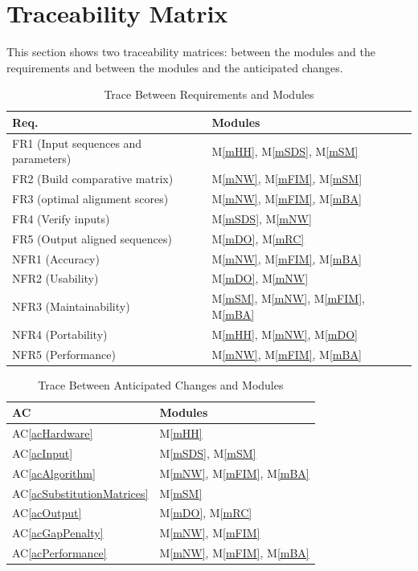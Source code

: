 \documentclass[12pt, titlepage]{article}
\newcommand{\acref}[1]{AC\ref{#1}}
\newcommand{\mref}[1]{M\ref{#1}}
\begin{document}
\section{Traceability Matrix} \label{SecTM}

This section shows two traceability matrices: between the modules and the
requirements and between the modules and the anticipated changes.

\begin{table}[H]
\centering
\begin{tabular}{p{} p{}}
\toprule
\textbf{Req.} & \textbf{Modules}\\
\midrule
FR1 (Input sequences and parameters) & \mref{mHH}, \mref{mSDS}, \mref{mSM} \\
FR2 (Build comparative matrix) & \mref{mNW}, \mref{mFIM}, \mref{mSM} \\
FR3 (optimal alignment scores) & \mref{mNW}, \mref{mFIM}, \mref{mBA} \\
FR4 (Verify inputs) & \mref{mSDS}, \mref{mNW} \\
FR5 (Output aligned sequences) & \mref{mDO}, \mref{mRC} \\
NFR1 (Accuracy) & \mref{mNW}, \mref{mFIM}, \mref{mBA} \\
NFR2 (Usability) & \mref{mDO}, \mref{mNW} \\
NFR3 (Maintainability) & \mref{mSM}, \mref{mNW}, \mref{mFIM}, \mref{mBA} \\
NFR4 (Portability) & \mref{mHH}, \mref{mNW}, \mref{mDO} \\
NFR5 (Performance) & \mref{mNW}, \mref{mFIM}, \mref{mBA} \\
\bottomrule
\end{tabular}
\caption{Trace Between Requirements and Modules}
\label{TblRT}
\end{table}

\begin{table}[H]
\centering
\begin{tabular}{p{} p{}}
\toprule
\textbf{AC} & \textbf{Modules}\\
\midrule
\acref{acHardware} & \mref{mHH} \\
\acref{acInput} & \mref{mSDS}, \mref{mSM} \\
\acref{acAlgorithm} & \mref{mNW}, \mref{mFIM}, \mref{mBA} \\
\acref{acSubstitutionMatrices} & \mref{mSM} \\
\acref{acOutput} & \mref{mDO}, \mref{mRC} \\
\acref{acGapPenalty} & \mref{mNW}, \mref{mFIM} \\
\acref{acPerformance} & \mref{mNW}, \mref{mFIM}, \mref{mBA} \\
\bottomrule
\end{tabular}
\caption{Trace Between Anticipated Changes and Modules}
\label{TblACT}
\end{table}
\end{document}
